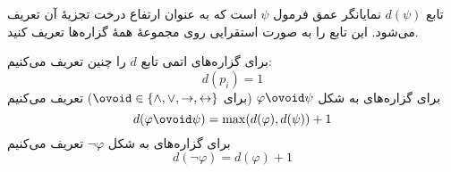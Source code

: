 تابع $d(\psi)$ نمایانگر عمق فرمول $\psi$ است که به عنوان ارتفاع درخت تجزیهٔ آن تعریف می‌شود. این تابع را به صورت استقرایی روی مجموعهٔ همهٔ گزاره‌ها تعریف کنید.
\begin{ans}
برای گزاره‌های اتمی تابع $d$ را چنین تعریف می‌کنیم:
$$d(p_i)=1$$
برای گزاره‌های به شکل
$\varphi\ovoid\psi$
(برای $\ovoid\in\{\wedge,\vee,\to,\leftrightarrow\}$)
تعریف می‌کنیم
$$d(\varphi\ovoid\psi)=\max(d(\varphi),d(\psi))+1$$
برای گزاره‌های به شکل
$\neg\varphi$
تعریف می‌کنیم
$$d(\neg\varphi)=d(\varphi)+1$$
\end{ans}

